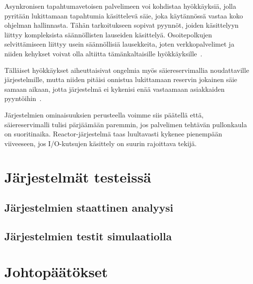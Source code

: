 \documentclass[12pt]{article}
\begin{document}
Asynkronisen tapahtumavetoisen palvelimeen voi kohdistaa hyökkäyksiä, jolla pyritään
lukittamaan tapahtumia käsittelevä säie, joka käytännössä vastaa koko ohjelman hallinnasta.
Tähän tarkoitukseen sopivat pyynnöt,
joiden käsittelyyn liittyy kompleksista säännöllisten lauseiden käsittelyä.
Osoitepolkujen selvittämiseen liittyy usein säännöllisiä lausekkeita,
joten verkkopalvelimet ja niiden
kehykset voivat olla altiitta tämänkaltaisille hyökkäyksille~\cite{davis_case_2017}.

Tälläiset hyökkäykset aiheuttaisivat ongelmia myös säiereservimallia
noudattaville järjestelmille, mutta niiden pitäisi onnistua
lukittamaan reservin jokainen säie samaan aikaan, jotta
järjestelmä ei kykenisi enää vastaamaan asiakkaiden pyyntöihin~\cite{davis_case_2017}.

Järjestelmien ominaisuuksien perusteella voimme siis päätellä että,
säiereservimalli
tulisi pärjäämään paremmin, jos palvelimen tehtävän pullonkaula on suoritinaika.
Reactor-järjestelmä
taas luultavasti kykenee pienempään viiveeseen,
jos I/O-kutsujen käsittely on suurin rajoittava tekijä.
\section{Järjestelmät testeissä}
\subsection{Järjestelmien staattinen analyysi}

\subsection{Järjestelmien testit simulaatiolla}



\section{Johtopäätökset}


\end{document}
